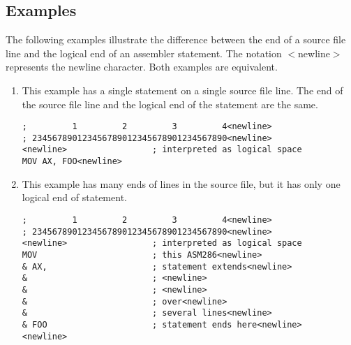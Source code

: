 \subsection*{Examples}
The following examples illustrate the difference between the end of a source file line and the logical end of an assembler statement. The notation $<$newline$>$ represents the newline character. Both examples are equivalent.
\begin{enumerate}
\item This example has a single statement on a single source file line. The end of the source file line and the logical end of the statement are the same.
\begin{verbatim}
;         1         2         3         4<newline>
; 234567890123456789012345678901234567890<newline>
<newline>                 ; interpreted as logical space 
MOV AX, FOO<newline>
\end{verbatim}
\item This example has many ends of lines in the source file, but it has only one logical end of statement.
\begin{verbatim}
;         1         2         3         4<newline>
; 234567890123456789012345678901234567890<newline>
<newline>                 ; interpreted as logical space 
MOV                       ; this ASM286<newline>
& AX,                     ; statement extends<newline>
&                         ; <newline>
&                         ; <newline>
&                         ; over<newline>
&                         ; several lines<newline>
& FOO                     ; statement ends here<newline>
<newline> 
\end{verbatim}
\end{enumerate}
